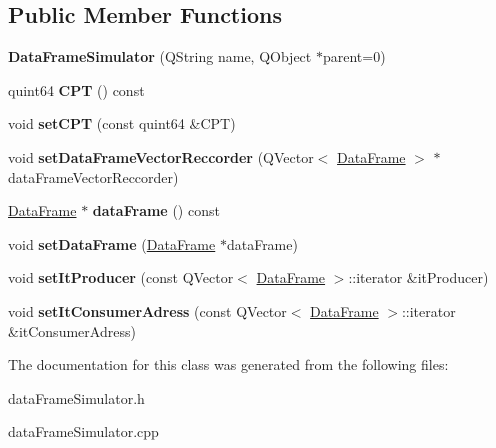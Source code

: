 \subsection*{Public Member Functions}
\begin{DoxyCompactItemize}
\item 
\mbox{\label{class_data_frame_simulator_a384daeb299f34b67f9c290965af30a84}} 
{\bfseries Data\+Frame\+Simulator} (Q\+String name, Q\+Object $\ast$parent=0)
\item 
\mbox{\label{class_data_frame_simulator_a343facc0d76bbc5ddf62b3c61518c73c}} 
quint64 {\bfseries C\+PT} () const
\item 
\mbox{\label{class_data_frame_simulator_a523d1e36774c63190191716b913647ee}} 
void {\bfseries set\+C\+PT} (const quint64 \&C\+PT)
\item 
\mbox{\label{class_data_frame_simulator_ad00a82756a80b6b5f7b6f2946cf64019}} 
void {\bfseries set\+Data\+Frame\+Vector\+Reccorder} (Q\+Vector$<$ \hyperlink{class_data_frame}{Data\+Frame} $>$ $\ast$data\+Frame\+Vector\+Reccorder)
\item 
\mbox{\label{class_data_frame_simulator_ae1289addd967edd867ddd3e1e2227598}} 
\hyperlink{class_data_frame}{Data\+Frame} $\ast$ {\bfseries data\+Frame} () const
\item 
\mbox{\label{class_data_frame_simulator_afed632cf6ea82d9c6b7adf054339fee0}} 
void {\bfseries set\+Data\+Frame} (\hyperlink{class_data_frame}{Data\+Frame} $\ast$data\+Frame)
\item 
\mbox{\label{class_data_frame_simulator_a389c2dc948ae06915afaa5ccecf031a4}} 
void {\bfseries set\+It\+Producer} (const Q\+Vector$<$ \hyperlink{class_data_frame}{Data\+Frame} $>$\+::iterator \&it\+Producer)
\item 
\mbox{\label{class_data_frame_simulator_a7b482c10bc6fb7b4be6594a2d74c3966}} 
void {\bfseries set\+It\+Consumer\+Adress} (const Q\+Vector$<$ \hyperlink{class_data_frame}{Data\+Frame} $>$\+::iterator \&it\+Consumer\+Adress)
\end{DoxyCompactItemize}


The documentation for this class was generated from the following files\+:\begin{DoxyCompactItemize}
\item 
data\+Frame\+Simulator.\+h\item 
data\+Frame\+Simulator.\+cpp\end{DoxyCompactItemize}
